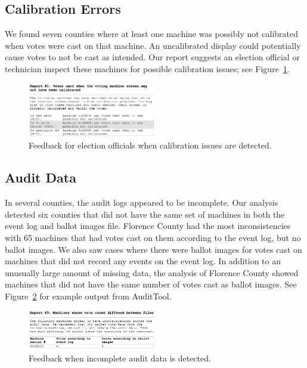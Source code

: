 \documentclass[letterpaper,twocolumn,10pt]{article}
\begin{document}
\subsection{Calibration Errors}
 We found seven counties where at least one machine was possibly not calibrated
when votes were cast on that machine. An uncalibrated display could potentially
cause votes to not be cast as intended. Our report suggests an election official
or technician inspect these machines for possible calibration issues; see
Figure~\ref{fig:calibration-issues}.


\begin{figure}[htbp]
\begin{center}
    \includegraphics[width=0.5\textwidth,height=0.2\textheight]{NotCalibrated.eps}
\end{center}
\caption{Feedback for election officials when calibration issues are detected.}
\label{fig:calibration-issues}
\end{figure}

\subsection{Audit Data}
 In several counties, the audit logs appeared to be incomplete. Our analysis
 detected six counties that did not have the same set of machines in both the
 event log and ballot images file. Florence County had the most inconsistencies
 with 65 machines that had votes cast on them according to the event log, but no
 ballot images. We also saw cases where there were ballot images for votes cast
 on machines that did not record any events on the event log. In addition to an
 unusually large amount of missing data, the analysis of Florence County showed
 machines that did not have the same number of votes cast as ballot images. See
 Figure~\ref{fig:incomplete-audit-data} for example output from AuditTool. 

\begin{figure}[htbp]
\begin{center}
    \includegraphics[width=0.5\textwidth,height=0.2\textheight]{IncompleteAuditData.eps}
\end{center}
\caption{Feedback when incomplete audit data is detected.}
\label{fig:incomplete-audit-data}
\end{figure}
\end{document}
